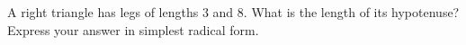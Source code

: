 A right triangle has legs of lengths $3$ and $8$. What is the length of its hypotenuse? Express your answer in simplest radical form.
